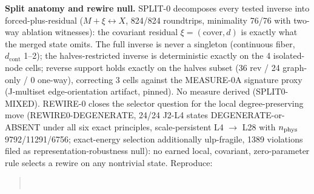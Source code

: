 \documentclass[11pt]{article}
\begin{document}
\textbf{Split anatomy and rewire null.} SPLIT-0 decomposes every tested
inverse into forced-plus-residual ($M + \xi \leftrightarrow X$, 824/824
roundtrips, minimality 76/76 with two-way ablation witnesses): the
covariant residual $\xi = (\mathrm{cover}, d)$ is exactly what the merged
state omits. The full inverse is never a singleton (continuous fiber,
$d_{\mathrm{cont}}$ 1--2); the halves-restricted inverse is deterministic
exactly on the 4 isolated-node cells; reverse support holds exactly on the
halves subset (36 rev / 24 graph-only / 0 one-way), correcting 3 cells
against the MEASURE-0A signature proxy (J-multiset edge-orientation
artifact, pinned). No measure derived (SPLIT0-MIXED).
REWIRE-0 closes the selector question for the local degree-preserving move
(REWIRE0-DEGENERATE, 24/24 J2-L4 states DEGENERATE-or-ABSENT under all six
exact principles, scale-persistent L4 $\to$ L28 with $n_{\rm phys}$
9792/11291/6756; exact-energy selection additionally ulp-fragile, 1389
violations filed as representation-robustness null): no earned local,
covariant, zero-parameter rule selects a rewire on any nontrivial state.
Reproduce:
\begin{quote}\small
{}\\
\end{quote}
\end{document}
